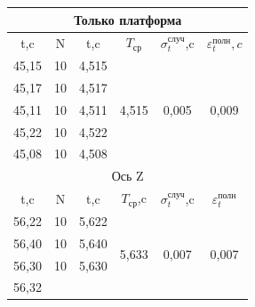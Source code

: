 \newpage

\begin{table}[h!]
\centering
\begin{tabular}{|cccccc|}
\hline
\multicolumn{6}{|c|}{Только платформа} \\ \hline
\multicolumn{1}{|c|}{t,c} &
  \multicolumn{1}{c|}{N} &
  \multicolumn{1}{c|}{t,c} &
  \multicolumn{1}{c|}{$T_\text{ср}$} &
  \multicolumn{1}{c|}{$\sigma_t^\text{случ}$,c} &
  $\varepsilon_t^\text{полн},c$ \\ \hline
\multicolumn{1}{|c|}{45,15} &
  \multicolumn{1}{c|}{10} &
  \multicolumn{1}{c|}{4,515} &
  \multicolumn{1}{c|}{\multirow{5}{*}{4,515}} &
  \multicolumn{1}{c|}{\multirow{5}{*}{0,005}} &
  \multirow{5}{*}{0,009} \\ \cline{1-3}
\multicolumn{1}{|c|}{45,17} &
  \multicolumn{1}{c|}{10} &
  \multicolumn{1}{c|}{4,517} &
  \multicolumn{1}{c|}{} &
  \multicolumn{1}{c|}{} &
   \\ \cline{1-3}
\multicolumn{1}{|c|}{45,11} &
  \multicolumn{1}{c|}{10} &
  \multicolumn{1}{c|}{4,511} &
  \multicolumn{1}{c|}{} &
  \multicolumn{1}{c|}{} &
   \\ \cline{1-3}
\multicolumn{1}{|c|}{45,22} &
  \multicolumn{1}{c|}{10} &
  \multicolumn{1}{c|}{4,522} &
  \multicolumn{1}{c|}{} &
  \multicolumn{1}{c|}{} &
   \\ \cline{1-3}
\multicolumn{1}{|c|}{45,08} &
  \multicolumn{1}{c|}{10} &
  \multicolumn{1}{c|}{4,508} &
  \multicolumn{1}{c|}{} &
  \multicolumn{1}{c|}{} &
   \\ \hline
\multicolumn{6}{|c|}{Ось Z} \\ \hline
\multicolumn{1}{|c|}{t,c} &
  \multicolumn{1}{c|}{N} &
  \multicolumn{1}{c|}{t,c} &
  \multicolumn{1}{c|}{$T_\text{ср}$,c} &
  \multicolumn{1}{c|}{$\sigma_t^\text{случ}$,c} &
  $\varepsilon_t^\text{полн}$ \\ \hline
\multicolumn{1}{|c|}{56,22} &
  \multicolumn{1}{c|}{10} &
  \multicolumn{1}{c|}{5,622} &
  \multicolumn{1}{c|}{\multirow{5}{*}{5,633}} &
  \multicolumn{1}{c|}{\multirow{5}{*}{0,007}} &
  \multirow{5}{*}{0,007} \\ \cline{1-3}
\multicolumn{1}{|c|}{56,40} &
  \multicolumn{1}{c|}{10} &
  \multicolumn{1}{c|}{5,640} &
  \multicolumn{1}{c|}{} &
  \multicolumn{1}{c|}{} &
   \\ \cline{1-3}
\multicolumn{1}{|c|}{56,30} &
  \multicolumn{1}{c|}{10} &
  \multicolumn{1}{c|}{5,630} &
  \multicolumn{1}{c|}{} &
  \multicolumn{1}{c|}{} &
   \\ \cline{1-3}
\multicolumn{1}{|c|}{56,32} &

\end{tabular}
\end{table}
